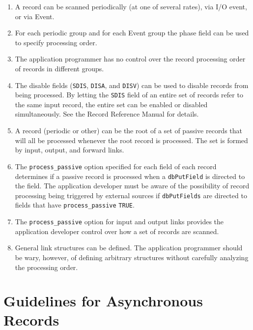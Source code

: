 \begin{enumerate}
\item A record can be scanned periodically (at one of several rates), via I/O event, or via Event.

\item For each periodic group and for each Event group the phase field can be used to specify processing order.

\item The application programmer has no control over the record processing order of records in different groups.

\item The disable fields (\verb|SDIS|, \verb|DISA|, and \verb|DISV|) can be used to disable records from being processed. By letting the 
\verb|SDIS| field of an entire set of records refer to the same input record, the entire set can be enabled or disabled 
simultaneously. See the Record Reference Manual for details.

\item A record (periodic or other) can be the root of a set of passive records that will all be processed whenever the root 
record is processed. The set is formed by input, output, and forward links.

\item The \verb|process_passive| option specified for each field of each record determines if a passive record is processed 
when a \verb|dbPutField| is directed to the field. The application developer must be aware of the possibility of record 
processing being triggered by external sources if \verb|dbPutFields| are directed to fields that have 
\verb|process_passive| \verb|TRUE|.

\item The \verb|process_passive| option for input and output links provides the application developer control over how a 
set of records are scanned.

\item General link structures can be defined. The application programmer should be wary, however, of defining arbitrary 
structures without carefully analyzing the processing order. 

\end{enumerate}

\section{Guidelines for Asynchronous Records}

